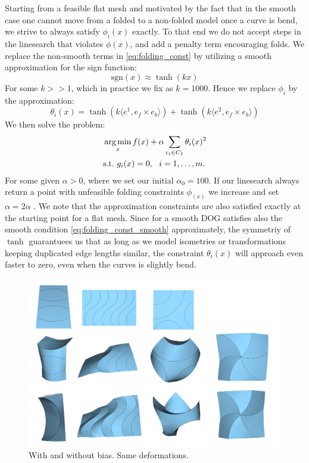 Starting from a feasible flat mesh and motivated by the fact that in the smooth case one cannot move from a folded to a non-folded model once a curve is bend, we strive to always satisfy $\phi_i(x)$ exactly. To that end we do not accept steps in the linesearch that violates $\phi(x)$, and add a penalty term encouraging folds. We replace the non-smooth terms in \eqref{eq:folding_const} by utilizing a smooth approximation for the sign function:
\begin{equation} \label{eq:sign_smooth_approx}
\text{sgn}(x) \approx \tanh(kx)
\end{equation}
For some $k >> 1$, which in practice we fix as $k = 1000$. Hence we replace $\phi_i$ by the approximation:
\begin{equation} \label{eq:folding_const}
\theta_i(x) = \tanh(k\langle e^1,e_f \times e_b \rangle) +  \tanh(k\langle e^2,e_f \times e_b\rangle)
\end{equation}
We then solve the problem:
\begin{equation} \label{eq:const_opt}
\begin{aligned}
& \operatorname*{arg\,min}_x
f(x) + \alpha \sum_{c_i \in C_{I}} \theta_i(x)^2\\
& \textrm{s.t.}
\text{ } g_i(x) = 0, \ \  i = 1, \ldots, m.
\end{aligned}
\end{equation}
For some given $\alpha > 0$, where we set our initial $\alpha_0 = 100$. If our linesearch always return a point with unfeasible folding constraints $\phi_(x)$ we increase and set $\alpha = 2\alpha$ .
We note that the approximation constraints are also satisfied exactly at the starting point for a flat mesh. Since for a smooth DOG satisfies also the smooth condition \eqref{eq:folding_const_smooth} approximately, the symmetriy of $\tanh$ guarantuees us that as long as we model isometries or transformations keeping duplicated edge lengths similar, the constraint $\theta_i(x)$ will approach even faster to zero, even when the curves is slightly bend.

\begin{figure} [h]
	\centering
	\includegraphics[width=\linewidth]{figures/fold_bias_compare}
	\caption{With and without bias. Same deformations.  }
	\label{fig:fold_bias_compare}
\end{figure}



